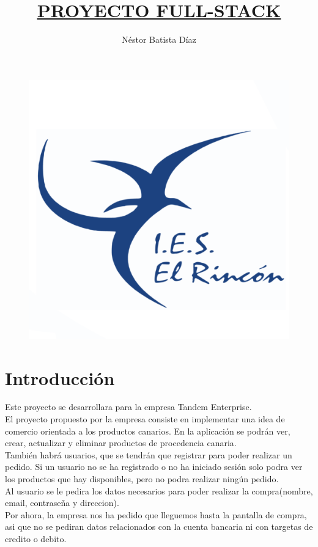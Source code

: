 \documentclass{article}
\title{\textbf{\underline{PROYECTO FULL-STACK}}}
\author{Néstor Batista Díaz }
\date{}
\begin{document}
\large
\maketitle
\vspace{20mm}
\begin{figure}[h]
    \centering
    \includegraphics[scale=0.5]{logoIES}
\end{figure}
\newpage

\newpage

\setcounter{tocdepth}{2}
\tableofcontents

\newpage

\section{Introducción}
\quad Este proyecto se desarrollara para la empresa Tandem Enterprise.\\
El proyecto propuesto por la empresa consiste en implementar una idea de comercio orientada a los productos canarios. En la aplicación se podrán ver, crear, actualizar y eliminar productos de procedencia canaria.\\También habrá usuarios, que se tendrán que registrar para poder realizar un pedido. Si un usuario no se ha registrado o no ha iniciado sesión solo podra ver los productos que hay disponibles, pero no podra realizar ningún pedido.\\ Al usuario se le pedira los datos necesarios para poder realizar la compra(nombre, email, contraseña y direccion).\\
Por ahora, la empresa nos ha pedido que lleguemos hasta la pantalla de compra, asi que no se pediran datos relacionados con la cuenta bancaria ni con targetas de credito o debito.
\end{document}

